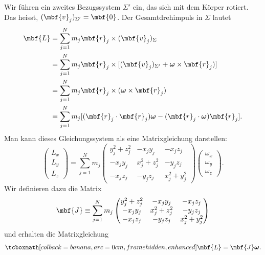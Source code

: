 Wir führen ein zweites Bezugssystem $\Sigma'$ ein, das sich mit dem Körper rotiert. Das heisst, $(\mbf{v}_j)_{\Sigma'} = \mbf{0}$. Der Gesamtdrehimpuls in $\Sigma$ lautet
\begin{equation}
  \begin{split}
    \mbf{L} &= \sum_{j=1}^N m_j\mbf{r}_j\times (\mbf{v}_j)_{\Sigma} \\
    &= \sum_{j=1}^N m_j\mbf{r}_j\times [(\mbf{v}_j)_{\Sigma'} + \boldsymbol{\omega}\times \mbf{r}_j)] \\
    &= \sum_{j=1}^N m_j\mbf{r}_j\times (\boldsymbol{\omega}\times \mbf{r}_j) \\
    &= \sum_{j=1}^N m_j[(\mbf{r}_j\cdot \mbf{r}_j)\boldsymbol{\omega} -  (\mbf{r}_j\cdot \boldsymbol{\omega}) \mbf{r}_j].
  \end{split}
\end{equation}
Man kann dieses Gleichungssystem als eine Matrixgleichung darstellen:
\begin{equation}
  \begin{pmatrix}
    L_x \\ L_y \\ L_z
  \end{pmatrix} = \sum_{j=1}^N m_j
  \begin{pmatrix}
    y_j^2 + z_j^2 & -x_jy_j & -x_jz_j \\
    -x_jy_j & x_j^2 + z_j^2 & -y_jz_j \\
    -x_jz_j & -y_jz_j &  x_j^2 + y_j^2
  \end{pmatrix}
  \begin{pmatrix}
    \omega_x \\ \omega_y \\ \omega_z
  \end{pmatrix}.
\end{equation}
Wir definieren dazu die Matrix
\begin{equation}
  \mbf{J}\equiv\sum_{j=1}^N m_j
  \begin{pmatrix}
    y_j^2 + z_j^2 & -x_jy_j & -x_jz_j \\
    -x_jy_j & x_j^2 + z_j^2 & -y_jz_j \\
    -x_jz_j & -y_jz_j &  x_j^2 + y_j^2
  \end{pmatrix}
\end{equation}
und erhalten die Matrixgleichung
\begin{equation}
  \eqbox{\mbf{L} = \mbf{J}\boldsymbol{\omega}.}
\end{equation}

